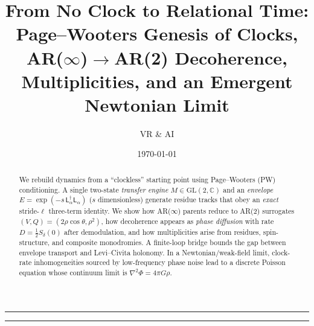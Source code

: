 \documentclass[11pt]{article}
\title{\vspace{-0.8cm}\Large From No Clock to Relational Time:\\
\large Page--Wooters Genesis of Clocks, AR($\infty$)$\to$AR(2) Decoherence, Multiplicities, and an Emergent Newtonian Limit}
\author{VR \& AI}
\date{\today}
\newcommand{\Lap}{\mathsf{L}_\alpha}
\begin{document}
\maketitle
\vspace{-1.2em}\hrule\vspace{0.6em}

\begin{abstract}
We rebuild dynamics from a ``clockless'' starting point using Page--Wooters (PW) conditioning.
A single two-state \emph{transfer engine} $M\!\in\!\mathrm{GL}(2,\mathbb C)$ and an \emph{envelope} $E=\exp(-s\,\Lap^\dagger\Lap)$ ($s$ dimensionless) generate residue tracks that obey an \emph{exact} stride-$\ell$ three-term identity. We show how AR($\infty$) parents reduce to AR(2) surrogates $(V,Q)=(2\rho\cos\theta,\rho^2)$, how decoherence appears as \emph{phase diffusion} with rate $D=\tfrac12 S_\delta(0)$ after demodulation, and how multiplicities arise from residues, spin-structure, and composite monodromies. A finite-loop bridge bounds the gap between envelope transport and Levi--Civita holonomy. In a Newtonian/weak-field limit, clock-rate inhomogeneities sourced by low-frequency phase noise lead to a discrete Poisson equation whose continuum limit is $\nabla^2\Phi=4\pi G\rho$.
\end{abstract}

\tableofcontents
\vspace{0.6em}\hrule\vspace{0.8em}

\end{document}
